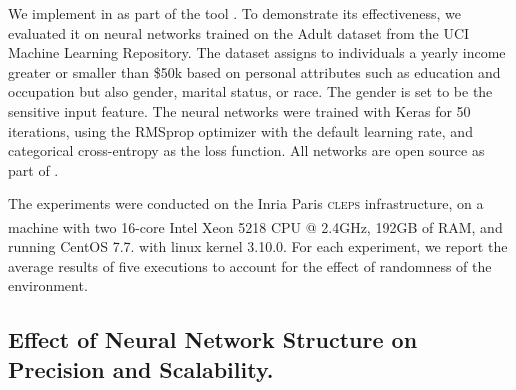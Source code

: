 We implement \qlibraname{} in \python{} as part of the tool \libra.\sidenote{\libraurl}
%
To demonstrate its effectiveness, we evaluated it on neural networks trained on
the
Adult dataset from the UCI Machine Learning Repository.
%
The dataset assigns to individuals a yearly income greater or smaller than \$50k based on personal attributes such as education and occupation but also gender, marital status, or race.
The gender is set to be the sensitive input feature.
%
%
The neural networks were trained with Keras for 50 iterations, using the RMSprop optimizer with the default learning rate, and categorical cross-entropy as the loss function.
%
All networks are open source as part of \libra.

%

The experiments were conducted on the Inria Paris \textsc{cleps} infrastructure, on a machine with two 16-core Intel\textsuperscript{\tiny{\textregistered}} Xeon\textsuperscript{\tiny{\textregistered}} 5218 CPU @ 2.4GHz, 192GB of RAM, and running CentOS 7.7. with linux kernel 3.10.0.
%
For each experiment, we report the average results of five executions to account for the effect of randomness of the environment.


\subsection{Effect of Neural Network Structure on Precision and Scalability.}

